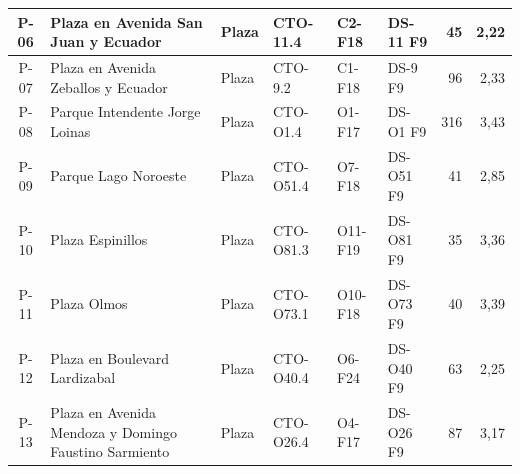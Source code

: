 \begin{longtable}{|c|>{\raggedright\arraybackslash}p{3.3cm}|l|l|>{\raggedright\arraybackslash}p{1.6cm}|>{\raggedright\arraybackslash}p{1.9cm}|r|r|}
P-06 & Plaza en Avenida San Juan y Ecuador & Plaza & CTO-11.4 & C2-F18 & DS-11 F9 & 45 & 2{,}22 \\ \hline
P-07 & Plaza en Avenida Zeballos y Ecuador & Plaza & CTO-9.2 & C1-F18 & DS-9 F9 & 96 & 2{,}33 \\ \hline
P-08 & Parque Intendente Jorge Loinas & Plaza & CTO-O1.4 & O1-F17 & DS-O1 F9 & 316 & 3{,}43 \\ \hline
P-09 & Parque Lago Noroeste & Plaza & CTO-O51.4 & O7-F18 & DS-O51 F9 & 41 & 2{,}85 \\ \hline
P-10 & Plaza Espinillos & Plaza & CTO-O81.3 & O11-F19 & DS-O81 F9 & 35 & 3{,}36 \\ \hline
P-11 & Plaza Olmos & Plaza & CTO-O73.1 & O10-F18 & DS-O73 F9 & 40 & 3{,}39 \\ \hline
P-12 & Plaza en Boulevard Lardizabal & Plaza & CTO-O40.4 & O6-F24 & DS-O40 F9 & 63 & 2{,}25 \\ \hline
P-13 & Plaza en Avenida Mendoza y Domingo Faustino Sarmiento & Plaza & CTO-O26.4 & O4-F17 & DS-O26 F9 & 87 & 3{,}17 \\ \hline
\end{longtable}
